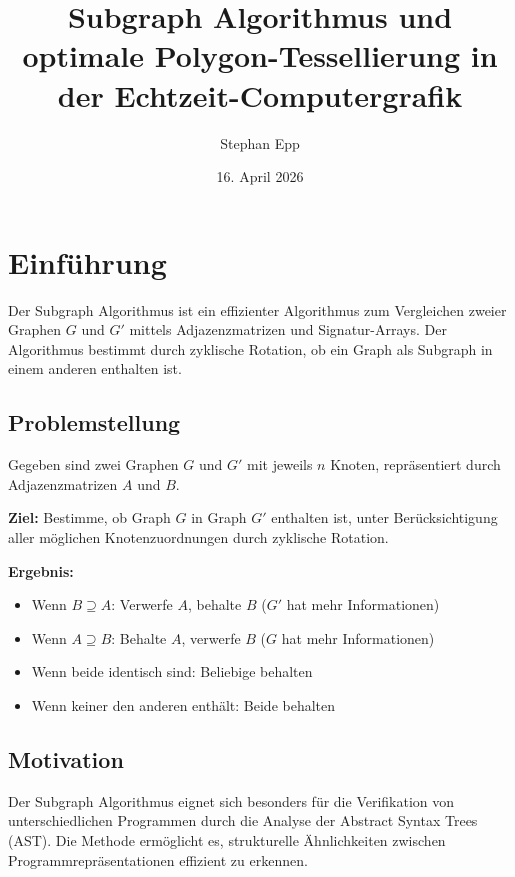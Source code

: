 ﻿\documentclass[a4paper,12pt]{article}
\title{\textbf{Subgraph Algorithmus und optimale Polygon-Tessellierung in der Echtzeit-Computergrafik}}
\author{Stephan Epp}
\date{16. April 2026}
\theoremstyle{definition}
\begin{document}
\maketitle

\tableofcontents
\newpage

\section{Einf\"uhrung}

Der Subgraph Algorithmus ist ein effizienter Algorithmus zum Vergleichen zweier
Graphen $G$ und $G'$ mittels Adjazenzmatrizen und Signatur-Arrays. Der Algorithmus
bestimmt durch zyklische Rotation, ob ein Graph als Subgraph in einem anderen enthalten ist.

\subsection{Problemstellung}

Gegeben sind zwei Graphen $G$ und $G'$ mit jeweils $n$ Knoten, repr\"asentiert
durch Adjazenzmatrizen $A$ und $B$.

\textbf{Ziel:} Bestimme, ob Graph $G$ in Graph $G'$ enthalten ist, unter
Ber\"ucksichtigung aller m\"oglichen Knotenzuordnungen durch zyklische Rotation.

\textbf{Ergebnis:}
\begin{itemize}
	\item Wenn $B \supseteq A$: Verwerfe $A$, behalte $B$ ($G'$ hat mehr Informationen)
	\item Wenn $A \supseteq B$: Behalte $A$, verwerfe $B$ ($G$ hat mehr Informationen)
	\item Wenn beide identisch sind: Beliebige behalten
	\item Wenn keiner den anderen enth\"alt: Beide behalten
\end{itemize}

\subsection{Motivation}

Der Subgraph Algorithmus eignet sich besonders f\"ur die Verifikation von
unterschiedlichen Programmen durch die Analyse der Abstract Syntax Trees (AST).
Die Methode erm\"oglicht es, strukturelle \"Ahnlichkeiten zwischen
Programmrepr\"asentationen effizient zu erkennen.
\end{document}
